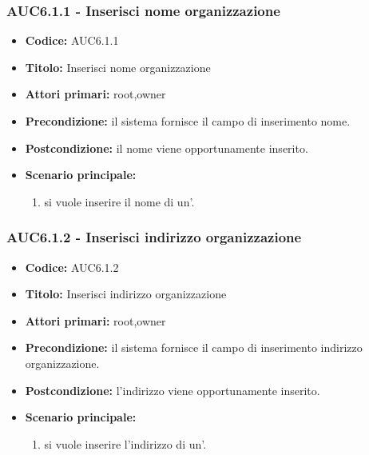 \documentclass[casi-duso]{subfiles}
\begin{document}
  \subsubsection{AUC6.1.1 - Inserisci nome organizzazione}%
  \label{subsub:AUC6.1.1}
  \begin{itemize}
    \item \textbf{Codice:} AUC6.1.1
    \item \textbf{Titolo:} Inserisci nome organizzazione
    \item \textbf{Attori primari:} root,owner
    \item \textbf{Precondizione:} il sistema fornisce il campo di inserimento nome.
    \item \textbf{Postcondizione:} il nome viene opportunamente inserito.
    \item \textbf{Scenario principale:} 
    \begin{enumerate}
      \item si vuole inserire il nome di un'.
    \end{enumerate}
    
  \end{itemize}
  
  \subsubsection{AUC6.1.2 - Inserisci indirizzo organizzazione}%
  \label{subsub:AUC6.1.2}
  \begin{itemize}
    \item \textbf{Codice:} AUC6.1.2
    \item \textbf{Titolo:} Inserisci indirizzo organizzazione
    \item \textbf{Attori primari:} root,owner
    \item \textbf{Precondizione:} il sistema fornisce il campo di inserimento indirizzo organizzazione.
    \item \textbf{Postcondizione:} l'indirizzo viene opportunamente inserito.
    \item \textbf{Scenario principale:}
    \begin{enumerate}
      \item si vuole inserire l'indirizzo di un'.
    \end{enumerate}
  \end{itemize}
  
\end{document}
